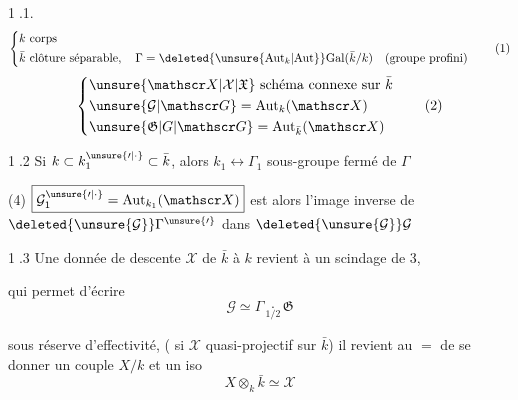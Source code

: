 \textcircled{1.1.}
\[
\left\{\begin{aligned}
&k\ \text{corps}\\
&\bar k\ \text{clôture séparable},\quad \Gamma=\deleted{\unsure{\mathrm{Aut}_k|\mathrm{Aut}}}\mathrm{Gal}(\bar k/k)\quad\text{(groupe profini)}
\end{aligned}\right. \tag*{(1)}
\]
\[
\left\{\begin{aligned}
&\unsure{\mathscr X|\mathcal X|\mathfrak X}\ \text{schéma connexe sur }\bar k\\
&\unsure{\mathcal G|\mathscr G}=\mathrm{Aut}_{k}(\mathscr X)\\
&\unsure{\mathfrak G|G|\mathscr G}=\mathrm{Aut}_{\bar k}(\mathscr X)
\end{aligned}\right. \tag*{(2)}
\]


\textcircled{1.2} Si $k\subset k_1^{\unsure{\prime|\cdot}}\subset\bar k$, alors $k_1\longleftrightarrow\Gamma_1$ sous-groupe fermé de $\Gamma$

(4) $\boxed{\mathcal G_1^{\unsure{\prime|\cdot}}=\mathrm{Aut}_{k_1}(\mathscr X)}$ est alors l’image inverse de $\deleted{\unsure{\mathcal G}}\Gamma^{\unsure{\prime}}$ dans $\deleted{\unsure{\mathcal G}}\mathcal G$


\textcircled{1.3} Une donnée de descente  $\mathscr X$ de $\bar k$ à $k$ revient à un scindage de 3,


qui permet d’écrire
\[
\mathcal G\simeq\Gamma\mathbin{\underset{1/2}{\cdot}}\mathfrak G \tag*{(7)}
\]

 sous réserve  d’effectivité,  ( si $\mathscr X$ quasi-projectif sur $\bar k$) il revient au $=$ de se donner un couple $X/k$ et un iso
\[
X\otimes_k\bar k\simeq\mathscr X \tag*{(8)}
\]
